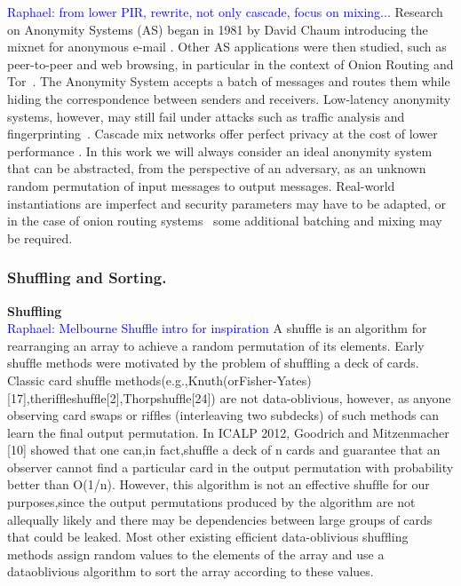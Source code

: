 \documentclass[conference]{IEEEtran}
\newcommand{\raphael}[1]{\textcolor{blue}{Raphael: #1}}
\begin{document}
\raphael{from lower PIR, rewrite, not only cascade, focus on mixing...}
Research on Anonymity Systems (AS) began in 1981 by David Chaum introducing the mixnet for anonymous e-mail \cite{Pseudo}.
Other AS applications were then studied, such as peer-to-peer and web browsing, in particular in the context of Onion Routing and Tor~\cite{DBLP:conf/uss/DingledineMS04}.
The Anonymity System accepts a batch of messages and routes them while hiding the correspondence between senders and receivers.
Low-latency anonymity systems, however, may still fail under attacks such as traffic analysis and fingerprinting~\cite{Fingerprinting}.
Cascade mix networks offer perfect privacy at the cost of lower performance \cite{berthold2001disadvantages}.
In this work we will always consider an ideal anonymity system that can be abstracted, from the perspective of an adversary, as an unknown random permutation of input messages to output messages. Real-world instantiations are imperfect and security parameters may have to be adapted, or in the case of onion routing systems~\cite{DBLP:conf/uss/DingledineMS04} some additional batching and mixing may be required.

\subsubsection{Shuffling and Sorting.}

\noindent\textbf{Shuffling} \\

\raphael{Melbourne Shuffle intro for inspiration}
A shufﬂe is an algorithm for rearranging an array to achieve a random permutation of its elements.
Early shufﬂe methods were motivated by the problem of shufﬂing a deck of cards.
Classic card shufﬂe methods(e.g.,Knuth(orFisher-Yates)[17],therifﬂeshufﬂe[2],Thorpshufﬂe[24]) are not data-oblivious, however, as anyone observing card swaps or rifﬂes (interleaving two subdecks) of such methods can learn the ﬁnal output permutation.
In ICALP 2012, Goodrich and Mitzenmacher [10] showed that one can,in fact,shufﬂe a deck of n cards and guarantee that an observer cannot ﬁnd a particular card in the output permutation with probability better than O(1/n).
However, this algorithm is not an effective shufﬂe for our purposes,since the output permutations produced by the algorithm are not allequally likely and there may be dependencies between large groups of cards that could be leaked.
Most other existing efﬁcient data-oblivious shufﬂing methods assign random values to the elements of the array and use a dataoblivious algorithm to sort the array according to these values.
\end{document}
